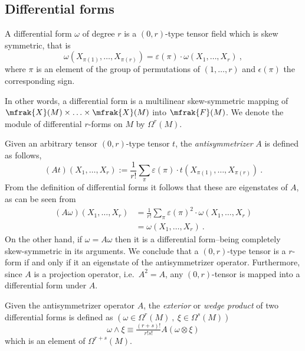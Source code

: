 \documentclass[10pt,reqno]{amsart}
\numberwithin{equation}{section}
\begin{document}
\subsection{Differential forms}

\begin{definition}
	A differential form $\omega$ of degree $r$ is a $(0,r)$-type 
	tensor field which is skew symmetric, that is
	\begin{equation}
		\omega(X_{\pi(1)},\ldots,X_{\pi(r)}) = 
		\varepsilon(\pi)\cdot \omega(X_1,\ldots,X_r)~,
	\end{equation}
	where $\pi$ is an element of the group of permutations of 
	$(1,\ldots,r)$ and $\epsilon(\pi)$ the corresponding sign.
\end{definition}
%
In other words, a differential form is a multilinear 
skew-symmetric mapping of $\mfrak{X}(M) \times \ldots \times 
\mfrak{X}(M)$ into $\mfrak{F}(M)$. We denote the module of 
differential $r$-forms on $M$ by $\Omega^r(M)$.

Given an arbitrary tensor $(0,r)$-type tensor $t$, the 
\emph{antisymmetrizer} $A$ is defined as follows,
%
\begin{equation}
	(At)(X_1,\ldots,X_r) := \frac{1}{r!} \sum_\pi \varepsilon(\pi) 
	\cdot t(X_{\pi(1)},\ldots,X_{\pi(r)})~.
\end{equation}
%
From the definition of differential forms it follows that these 
are eigenstates of $A$, as can be seen from
%
\begin{displaymath}
	\begin{split}
		(A\omega)(X_1,\ldots,X_r) &= \frac{1}{r!} \sum_\pi 
		\varepsilon(\pi)^2 \cdot \omega(X_1,\ldots,X_r) \\
		&= \omega(X_1,\ldots,X_r)~.
	\end{split}
\end{displaymath}
On the other hand, if $\omega = A\omega$ then it is a 
differential form--being completely skew-symmetric in its 
arguments. We conclude that a $(0,r)$-type tensor is a $r$-form 
if and only if it an eigenstate of the antisymmetrizer operator.  
Furthermore, since $A$ is a projection operator, i.e.~$A^2=A$, 
any $(0,r)$-tensor is mapped into a differential form under $A$.

Given the antisymmetrizer operator $A$, the \emph{exterior} or 
\emph{wedge product} of two differential forms is defined as 
$(\omega \in \Omega^r(M)~,~\xi \in \Omega^s(M))$
%
\begin{equation}
	\omega \wedge \xi \equiv \tfrac{(r+s)!}{r!s!} A(\omega \otimes 
	\xi)
\end{equation}
which is an element of $\Omega^{r+s}(M)$.
\end{document}
